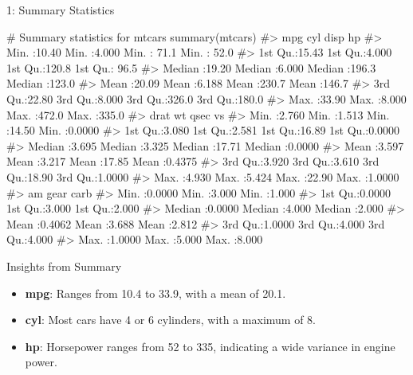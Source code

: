 \documentclass[
  18 pt,
  ignorenonframetext,
  aspectratio=1610,
]{beamer}
\newenvironment{Shaded}{\begin{snugshade}}{\end{snugshade}}
\newcommand{\CommentTok}[1]{\textcolor[rgb]{0.37,0.37,0.37}{#1}}
\newcommand{\FunctionTok}[1]{\textcolor[rgb]{0.28,0.35,0.67}{#1}}
\newcommand{\NormalTok}[1]{\textcolor[rgb]{0.00,0.23,0.31}{#1}}
\providecommand{\tightlist}{%
  \setlength{\itemsep}{0pt}\setlength{\parskip}{0pt}}\usepackage{longtable,booktabs,array}
\begin{document}
\begin{frame}[fragile]{1: Summary Statistics}
\protect\hypertarget{summary-statistics}{}
\tiny

\begin{Shaded}
\begin{Highlighting}[]
\CommentTok{\# Summary statistics for mtcars}
\FunctionTok{summary}\NormalTok{(mtcars)}
\CommentTok{\#\textgreater{}       mpg             cyl             disp             hp       }
\CommentTok{\#\textgreater{}  Min.   :10.40   Min.   :4.000   Min.   : 71.1   Min.   : 52.0  }
\CommentTok{\#\textgreater{}  1st Qu.:15.43   1st Qu.:4.000   1st Qu.:120.8   1st Qu.: 96.5  }
\CommentTok{\#\textgreater{}  Median :19.20   Median :6.000   Median :196.3   Median :123.0  }
\CommentTok{\#\textgreater{}  Mean   :20.09   Mean   :6.188   Mean   :230.7   Mean   :146.7  }
\CommentTok{\#\textgreater{}  3rd Qu.:22.80   3rd Qu.:8.000   3rd Qu.:326.0   3rd Qu.:180.0  }
\CommentTok{\#\textgreater{}  Max.   :33.90   Max.   :8.000   Max.   :472.0   Max.   :335.0  }
\CommentTok{\#\textgreater{}       drat             wt             qsec             vs        }
\CommentTok{\#\textgreater{}  Min.   :2.760   Min.   :1.513   Min.   :14.50   Min.   :0.0000  }
\CommentTok{\#\textgreater{}  1st Qu.:3.080   1st Qu.:2.581   1st Qu.:16.89   1st Qu.:0.0000  }
\CommentTok{\#\textgreater{}  Median :3.695   Median :3.325   Median :17.71   Median :0.0000  }
\CommentTok{\#\textgreater{}  Mean   :3.597   Mean   :3.217   Mean   :17.85   Mean   :0.4375  }
\CommentTok{\#\textgreater{}  3rd Qu.:3.920   3rd Qu.:3.610   3rd Qu.:18.90   3rd Qu.:1.0000  }
\CommentTok{\#\textgreater{}  Max.   :4.930   Max.   :5.424   Max.   :22.90   Max.   :1.0000  }
\CommentTok{\#\textgreater{}        am              gear            carb      }
\CommentTok{\#\textgreater{}  Min.   :0.0000   Min.   :3.000   Min.   :1.000  }
\CommentTok{\#\textgreater{}  1st Qu.:0.0000   1st Qu.:3.000   1st Qu.:2.000  }
\CommentTok{\#\textgreater{}  Median :0.0000   Median :4.000   Median :2.000  }
\CommentTok{\#\textgreater{}  Mean   :0.4062   Mean   :3.688   Mean   :2.812  }
\CommentTok{\#\textgreater{}  3rd Qu.:1.0000   3rd Qu.:4.000   3rd Qu.:4.000  }
\CommentTok{\#\textgreater{}  Max.   :1.0000   Max.   :5.000   Max.   :8.000}
\end{Highlighting}
\end{Shaded}

\begin{block}{Insights from Summary}
\protect\hypertarget{insights-from-summary}{}
\begin{itemize}
\tightlist
\item
  \textbf{mpg}: Ranges from 10.4 to 33.9, with a mean of 20.1.
\item
  \textbf{cyl}: Most cars have 4 or 6 cylinders, with a maximum of 8.
\item
  \textbf{hp}: Horsepower ranges from 52 to 335, indicating a wide
  variance in engine power.
\end{itemize}

\normalsize
\end{block}
\end{frame}
\end{document}
